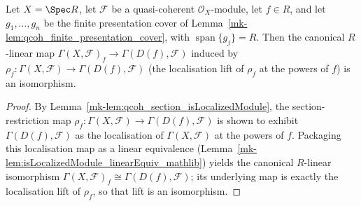 \begin{lemma}\label{mk-lem:qcoh_section_kernel_comparison}
  \leanok

  Let \(X = \Spec R\), let \(\mathcal{F}\) be a quasi-coherent \(\mathcal{O}_X\)-module, let \(f \in R\),
  and let \(g_1, \ldots, g_n\) be the finite presentation cover of
  Lemma~\ref{mk-lem:qcoh_finite_presentation_cover}, with \(\operatorname{span}\{g_j\} = R\). Then the
  canonical \(R\)-linear map \(\Gamma(X, \mathcal{F})_f \to \Gamma(D(f), \mathcal{F})\) induced by
  \(\rho_f : \Gamma(X, \mathcal{F}) \to \Gamma(D(f), \mathcal{F})\) (the localisation lift of \(\rho_f\)
  at the powers of \(f\)) is an isomorphism.
\end{lemma}
\begin{proof}
  \leanok
    By Lemma~\ref{mk-lem:qcoh_section_isLocalizedModule}, the
  section-restriction map \(\rho_f : \Gamma(X, \mathcal{F}) \to \Gamma(D(f), \mathcal{F})\) is shown to
  exhibit \(\Gamma(D(f), \mathcal{F})\) as the localisation of \(\Gamma(X, \mathcal{F})\) at the powers of
  \(f\). Packaging this localisation map as a linear equivalence
  (Lemma~\ref{mk-lem:isLocalizedModule_linearEquiv_mathlib})
  yields the canonical \(R\)-linear isomorphism \(\Gamma(X, \mathcal{F})_f \cong \Gamma(D(f),
  \mathcal{F})\); its underlying map is exactly the localisation lift of \(\rho_f\), so that lift is an
  isomorphism.
\end{proof}

